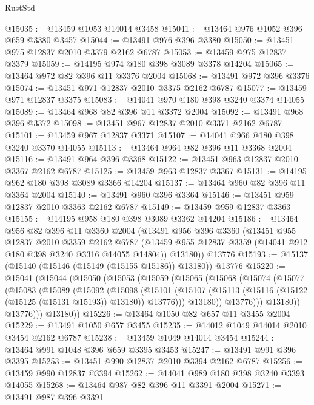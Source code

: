 \begin{lexlean}{RustStd}
\begin{coremodule}
@15035 := @13459 @1053 @14014 @3458
@15041 := @13464 @976 @1052 @396 @659 @3380 @3457
@15044 := @13491 @976 @396 @3380
@15050 := @13451 @975 @12837 @2010 @3379 @2162 @6787
@15053 := @13459 @975 @12837 @3379
@15059 := @14195 @974 @180 @398 @3089 @3378 @14204
@15065 := @13464 @972 @82 @396 @11 @3376 @2004
@15068 := @13491 @972 @396 @3376
@15074 := @13451 @971 @12837 @2010 @3375 @2162 @6787
@15077 := @13459 @971 @12837 @3375
@15083 := @14041 @970 @180 @398 @3240 @3374 @14055
@15089 := @13464 @968 @82 @396 @11 @3372 @2004
@15092 := @13491 @968 @396 @3372
@15098 := @13451 @967 @12837 @2010 @3371 @2162 @6787
@15101 := @13459 @967 @12837 @3371
@15107 := @14041 @966 @180 @398 @3240 @3370 @14055
@15113 := @13464 @964 @82 @396 @11 @3368 @2004
@15116 := @13491 @964 @396 @3368
@15122 := @13451 @963 @12837 @2010 @3367 @2162 @6787
@15125 := @13459 @963 @12837 @3367
@15131 := @14195 @962 @180 @398 @3089 @3366 @14204
@15137 := @13464 @960 @82 @396 @11 @3364 @2004
@15140 := @13491 @960 @396 @3364
@15146 := @13451 @959 @12837 @2010 @3363 @2162 @6787
@15149 := @13459 @959 @12837 @3363
@15155 := @14195 @958 @180 @398 @3089 @3362 @14204
@15186 := @13464
    @956
    @82
    @396
    @11
    @3360
    @2004
    (@13491
      @956
      @396
      @3360
      (@13451
        @955
        @12837
        @2010
        @3359
        @2162
        @6787
        (@13459 @955 @12837 @3359 (@14041 @912 @180 @398 @3240 @3316 @14055 @14804))
        @13180))
    @13776
@15193 := @15137 (@15140 (@15146 (@15149 (@15155 @15186)) @13180)) @13776
@15220 := @15041
    (@15044
      (@15050
        (@15053
          (@15059
            (@15065
              (@15068
                (@15074
                  (@15077
                    (@15083
                      (@15089
                        (@15092
                          (@15098
                            (@15101
                              (@15107
                                (@15113 (@15116 (@15122 (@15125 (@15131 @15193)) @13180)) @13776)))
                            @13180))
                        @13776)))
                  @13180))
              @13776)))
        @13180))
@15226 := @13464 @1050 @82 @657 @11 @3455 @2004
@15229 := @13491 @1050 @657 @3455
@15235 := @14012 @1049 @14014 @2010 @3454 @2162 @6787
@15238 := @13459 @1049 @14014 @3454
@15244 := @13464 @991 @1048 @396 @659 @3395 @3453
@15247 := @13491 @991 @396 @3395
@15253 := @13451 @990 @12837 @2010 @3394 @2162 @6787
@15256 := @13459 @990 @12837 @3394
@15262 := @14041 @989 @180 @398 @3240 @3393 @14055
@15268 := @13464 @987 @82 @396 @11 @3391 @2004
@15271 := @13491 @987 @396 @3391

\end{coremodule}
\end{lexlean}

